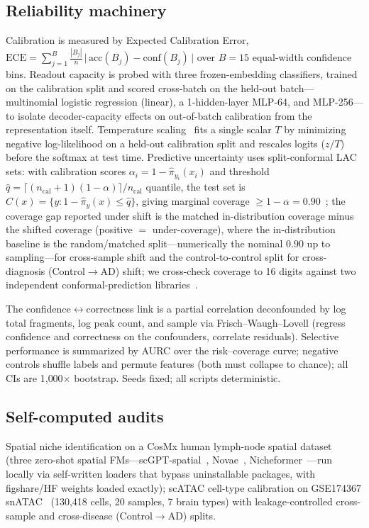 \documentclass[11pt]{article}
\begin{document}
\subsection{Reliability machinery}
Calibration is measured by Expected Calibration Error, $\mathrm{ECE}=\sum_{j=1}^{B}\frac{|B_j|}{n}\,\big|\,\mathrm{acc}(B_j)-\mathrm{conf}(B_j)\,\big|$ over $B{=}15$ equal-width confidence bins. Readout capacity is probed with three frozen-embedding classifiers, trained on the calibration split and scored cross-batch on the held-out batch---multinomial logistic regression (linear), a 1-hidden-layer MLP-64, and MLP-256---to isolate decoder-capacity effects on out-of-batch calibration from the representation itself. Temperature scaling~\cite{guo2017} fits a single scalar $T$ by minimizing negative log-likelihood on a held-out calibration split and rescales logits ($z/T$) before the softmax at test time. Predictive uncertainty uses split-conformal LAC sets: with calibration scores $\alpha_i = 1-\hat\pi_{y_i}(x_i)$ and threshold $\hat q = \lceil (n_{\mathrm{cal}}{+}1)(1{-}\alpha)\rceil/n_{\mathrm{cal}}$ quantile, the test set is $C(x)=\{y:1-\hat\pi_y(x)\le\hat q\}$, giving marginal coverage $\ge 1-\alpha=0.90$~\cite{angelopoulos2023}; the coverage gap reported under shift is the matched in-distribution coverage minus the shifted coverage (positive $=$ under-coverage), where the in-distribution baseline is the random/matched split---numerically the nominal $0.90$ up to sampling---for cross-sample shift and the control-to-control split for cross-diagnosis (Control$\to$AD) shift; we cross-check coverage to 16 digits against two independent conformal-prediction libraries~\cite{crepes,mapie}.

The confidence$\leftrightarrow$correctness link is a partial correlation deconfounded by log total fragments, log peak count, and sample via Frisch--Waugh--Lovell (regress confidence and correctness on the confounders, correlate residuals). Selective performance is summarized by AURC over the risk--coverage curve; negative controls shuffle labels and permute features (both must collapse to chance); all CIs are 1{,}000$\times$ bootstrap. Seeds fixed; all scripts deterministic.
\subsection{Self-computed audits}
Spatial niche identification on a CosMx human lymph-node spatial dataset~\cite{wang2026niche} (three zero-shot spatial FMs---scGPT-spatial~\cite{scgptspatial2025}, Novae~\cite{novae2025}, Nicheformer~\cite{nicheformer2025}---run locally via self-written loaders that bypass uninstallable packages, with figshare/HF weights loaded exactly); scATAC cell-type calibration on GSE174367 snATAC~\cite{morabito2021} (130{,}418 cells, 20 samples, 7 brain types) with leakage-controlled cross-sample and cross-disease (Control$\to$AD) splits.
\end{document}
